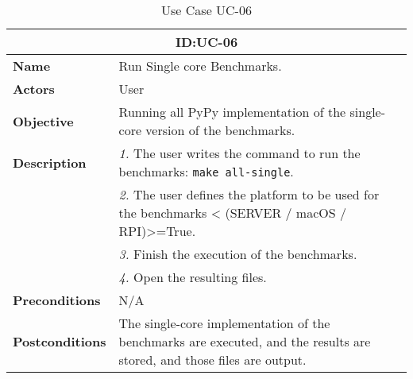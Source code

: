 \begin{table}[H]
    \centering
    \begin{tabular}{l p{10cm}}
        \toprule
        \multicolumn{2}{c}{\textbf{ID:\@ UC-06}} \\
        \toprule
        \textbf{Name}                         &  Run Single core Benchmarks. \\
        \textbf{Actors}                       &  User \\
        \textbf{Objective}                    &  Running all PyPy implementation of the single-core version of the benchmarks. \\
        \multirow{1}{*}{\textbf{Description}} & \textsl{1.} The user writes the command to run the benchmarks: \texttt{make all-single}.\\
                                              & \textsl{2.} The user defines the platform to be used for the benchmarks < (SERVER / macOS / RPI)>=True.\\
                                              & \textsl{3.} Finish the execution of the benchmarks.\\
                                              & \textsl{4.} Open the resulting files.\\
        \textbf{Preconditions}                &  N/A \\
        \textbf{Postconditions}               &  The single-core implementation of the benchmarks are executed, and the results are stored, and those files are output. \\
    \end{tabular}
    \caption{Use Case UC-06}\label{tab:uc-06}
\end{table}

